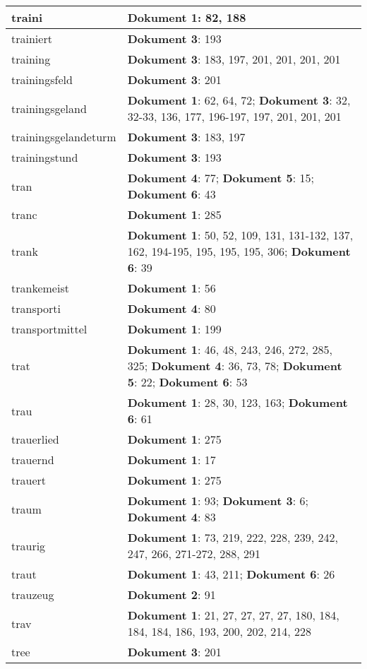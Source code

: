 \documentclass[a5paper]{article}
\begin{document}
\begin{longtable}[l]{|l|p{3in}|}
\hline
traini & \textbf{Dokument 1}: 82, 188 \\
\hline
trainiert & \textbf{Dokument 3}: 193 \\
\hline
training & \textbf{Dokument 3}: 183, 197, 201, 201, 201, 201 \\
\hline
trainingsfeld & \textbf{Dokument 3}: 201 \\
\hline
trainingsgeland & \textbf{Dokument 1}: 62, 64, 72; \textbf{Dokument 3}: 32, 32-33, 136, 177, 196-197, 197, 201, 201, 201 \\
\hline
trainingsgelandeturm & \textbf{Dokument 3}: 183, 197 \\
\hline
trainingstund & \textbf{Dokument 3}: 193 \\
\hline
tran & \textbf{Dokument 4}: 77; \textbf{Dokument 5}: 15; \textbf{Dokument 6}: 43 \\
\hline
tranc & \textbf{Dokument 1}: 285 \\
\hline
trank & \textbf{Dokument 1}: 50, 52, 109, 131, 131-132, 137, 162, 194-195, 195, 195, 195, 306; \textbf{Dokument 6}: 39 \\
\hline
trankemeist & \textbf{Dokument 1}: 56 \\
\hline
transporti & \textbf{Dokument 4}: 80 \\
\hline
transportmittel & \textbf{Dokument 1}: 199 \\
\hline
trat & \textbf{Dokument 1}: 46, 48, 243, 246, 272, 285, 325; \textbf{Dokument 4}: 36, 73, 78; \textbf{Dokument 5}: 22; \textbf{Dokument 6}: 53 \\
\hline
trau & \textbf{Dokument 1}: 28, 30, 123, 163; \textbf{Dokument 6}: 61 \\
\hline
trauerlied & \textbf{Dokument 1}: 275 \\
\hline
trauernd & \textbf{Dokument 1}: 17 \\
\hline
trauert & \textbf{Dokument 1}: 275 \\
\hline
traum & \textbf{Dokument 1}: 93; \textbf{Dokument 3}: 6; \textbf{Dokument 4}: 83 \\
\hline
traurig & \textbf{Dokument 1}: 73, 219, 222, 228, 239, 242, 247, 266, 271-272, 288, 291 \\
\hline
traut & \textbf{Dokument 1}: 43, 211; \textbf{Dokument 6}: 26 \\
\hline
trauzeug & \textbf{Dokument 2}: 91 \\
\hline
trav & \textbf{Dokument 1}: 21, 27, 27, 27, 27, 180, 184, 184, 184, 186, 193, 200, 202, 214, 228 \\
\hline
tree & \textbf{Dokument 3}: 201 \\

\end{longtable}
\end{document}
